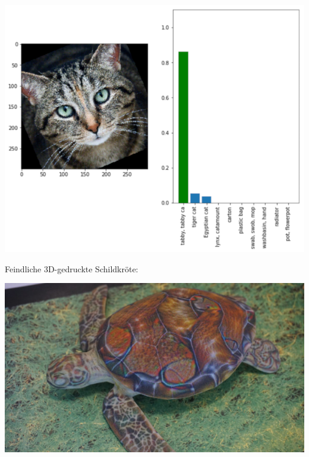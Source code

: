 \documentclass[aspectratio=43,x11names]{beamer}
\begin{document}
\begin{frame}
\begin{center}
\includegraphics[width=\textwidth]{images/cat_rotated.png} 
\end{center}
\end{frame}

\begin{frame}

\begin{center}
Feindliche 3D-gedruckte Schildkröte:
\end{center}

\begin{center}
\includegraphics[width=\textwidth]{images/rifle_turtle.jpg} 
\end{center}
\end{frame}
\end{document}
